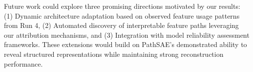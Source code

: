\documentclass{article} %
\begin{document}
Future work could explore three promising directions motivated by our results: (1) Dynamic architecture adaptation based on observed feature usage patterns from Run 4, (2) Automated discovery of interpretable feature paths leveraging our attribution mechanisms, and (3) Integration with model reliability assessment frameworks. These extensions would build on PathSAE's demonstrated ability to reveal structured representations while maintaining strong reconstruction performance.



\end{document}
